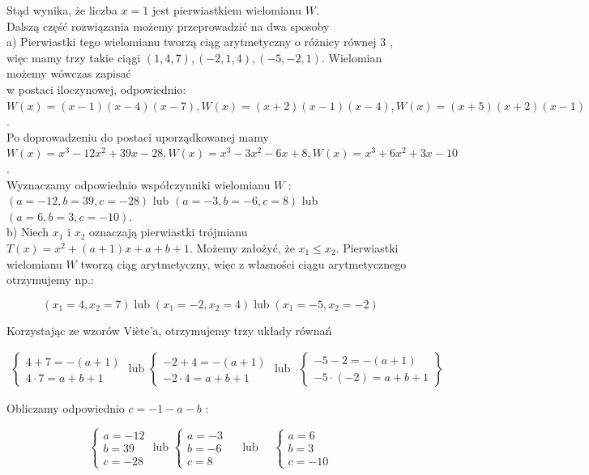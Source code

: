 \documentclass[10pt]{article}
\begin{document}
Stąd wynika, że liczba $x=1$ jest pierwiastkiem wielomianu $W$.\\
Dalszą część rozwiązania możemy przeprowadzić na dwa sposoby\\
a) Pierwiastki tego wielomianu tworzą ciąg arytmetyczny o różnicy równej 3 , więc mamy trzy takie ciągi $(1,4,7),(-2,1,4),(-5,-2,1)$. Wielomian możemy wówczas zapisać\\
w postaci iloczynowej, odpowiednio:\\
$W(x)=(x-1)(x-4)(x-7), W(x)=(x+2)(x-1)(x-4), W(x)=(x+5)(x+2)(x-1)$.\\
Po doprowadzeniu do postaci uporządkowanej mamy $W(x)=x^{3}-12 x^{2}+39 x-28, W(x)=x^{3}-3 x^{2}-6 x+8, W(x)=x^{3}+6 x^{2}+3 x-10$.\\
Wyznaczamy odpowiednio współczynniki wielomianu $W$ :\\
$(a=-12, b=39, c=-28)$ lub $(a=-3, b=-6, c=8)$ lub $(a=6, b=3, c=-10)$.\\
b) Niech $x_{1}$ i $x_{2}$ oznaczają pierwiastki trójmianu $T(x)=x^{2}+(a+1) x+a+b+1$. Możemy założyć, że $x_{1} \leq x_{2}$. Pierwiastki wielomianu $W$ tworzą ciąg arytmetyczny, więc z własności ciągu arytmetycznego otrzymujemy np.:

$$
\left(x_{1}=4, x_{2}=7\right) \operatorname{lub}\left(x_{1}=-2, x_{2}=4\right) \operatorname{lub}\left(x_{1}=-5, x_{2}=-2\right)
$$

Korzystając ze wzorów Viète'a, otrzymujemy trzy układy równań

$$
\begin{gathered}
\left\{\begin{array} { l } 
{ 4 + 7 = - ( a + 1 ) } \\
{ 4 \cdot 7 = a + b + 1 }
\end{array} \text { lub } \left\{\begin{array}{l}
-2+4=-(a+1) \\
-2 \cdot 4=a+b+1
\end{array}\right.\right. \text { lub }
\end{gathered}\left\{\begin{array}{l}
-5-2=-(a+1) \\
-5 \cdot(-2)=a+b+1
\end{array}\right\}
$$

Obliczamy odpowiednio $c=-1-a-b$ :

$$
\left\{\begin{array} { l } 
{ a = - 1 2 } \\
{ b = 3 9 } \\
{ c = - 2 8 }
\end{array} \text { lub } \left\{\begin{array} { l } 
{ a = - 3 } \\
{ b = - 6 } \\
{ c = 8 }
\end{array} \quad \text { lub } \quad \left\{\begin{array}{l}
a=6 \\
b=3 \\
c=-10
\end{array}\right.\right.\right.
$$
\end{document}
